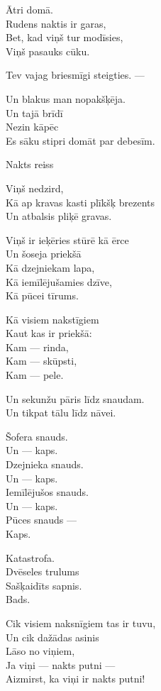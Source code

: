 \documentclass[14pt]{extarticle}
\begin{document}
Ātri domā.\\
Rudens naktis ir garas,\\
Bet, kad viņš tur modīsies,\\
Viņš pasauks cūku.

Tev vajag briesmīgi steigties. ---

Un blakus man nopakšķēja.\\
Un tajā brīdī\\
Nezin kāpēc\\
Es sāku stipri domāt par debesīm.


\newpage

{\large \sc Nakts reiss}

Viņš nedzird,\\
Kā ap kravas kasti plīkšķ brezents\\
Un atbalsis pliķē gravas.

Viņš ir ieķēries stūrē kā ērce\\
Un šoseja priekšā\\
Kā dzejniekam lapa,\\
Kā iemīlējušamies dzīve,\\
Kā pūcei tīrums.

Kā visiem nakstīgiem\\
Kaut kas ir priekšā:\\
Kam --- rinda,\\
Kam --- skūpsti,\\
Kam --- pele.

Un sekunžu pāris līdz snaudam.\\
Un tikpat tālu līdz nāvei.

Šofera snauds.\\
Un --- kaps.\\
Dzejnieka snauds.\\
Un --- kaps.\\
Iemīlējušos snauds.\\
Un --- kaps.\\
Pūces snauds ---\\
Kaps.

Katastrofa.\\
Dvēseles trulums\\
Sašķaidīts sapnis.\\
Bads.

Cik visiem naksnīgiem tas ir tuvu,\\
Un cik dažādas asinis\\
Lāso no viņiem,\\
Ja viņi --- nakts putni ---\\
Aizmirst, ka viņi ir nakts putni!
\end{document}
